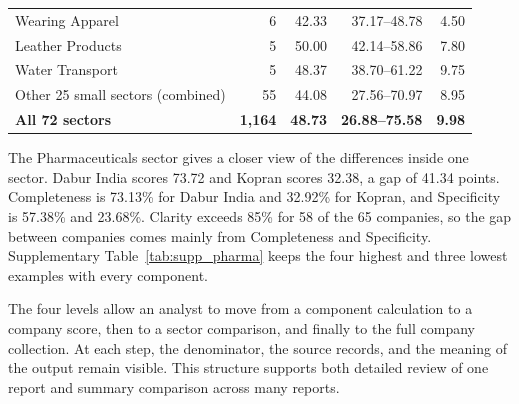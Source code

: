 \begin{table}[p]
\begin{singlepagetable}
\begin{tabularx}{\linewidth}{@{}Yrrrr@{}}
Wearing Apparel & 6 & 42.33 & 37.17--48.78 & 4.50 \\
Leather Products & 5 & 50.00 & 42.14--58.86 & 7.80 \\
Water Transport & 5 & 48.37 & 38.70--61.22 & 9.75 \\
\midrule
Other 25 small sectors (combined) & 55 & 44.08 & 27.56--70.97 & 8.95\\
\textbf{All 72 sectors} & \textbf{1,164} & \textbf{48.73} & \textbf{26.88--75.58} & \textbf{9.98}\\\bottomrule
\end{tabularx}
\endgroup
\end{singlepagetable}
\end{table}
\FloatBarrier

The Pharmaceuticals sector gives a closer view of the differences inside one sector. Dabur India scores 73.72 and Kopran scores 32.38, a gap of 41.34 points. Completeness is 73.13\% for Dabur India and 32.92\% for Kopran, and Specificity is 57.38\% and 23.68\%. Clarity exceeds 85\% for 58 of the 65 companies, so the gap between companies comes mainly from Completeness and Specificity. Supplementary Table~\ref{tab:supp_pharma} keeps the four highest and three lowest examples with every component.

The four levels allow an analyst to move from a component calculation to a company score, then to a sector comparison, and finally to the full company collection. At each step, the denominator, the source records, and the meaning of the output remain visible. This structure supports both detailed review of one report and summary comparison across many reports.

\FloatBarrier